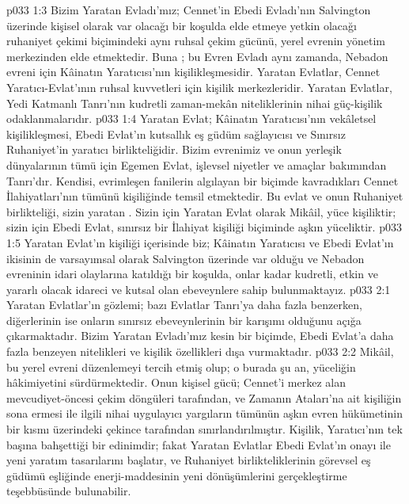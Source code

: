 \vs p033 1:3 Bizim Yaratan Evladı’mız; Cennet’in Ebedi Evladı’nın Salvington üzerinde kişisel olarak var olacağı bir koşulda elde etmeye yetkin olacağı ruhaniyet çekimi biçimindeki aynı ruhsal çekim gücünü, yerel evrenin yönetim merkezinden elde etmektedir. Buna ; bu Evren Evladı aynı zamanda, Nebadon evreni için Kâinatın Yaratıcısı’nın kişilikleşmesidir. Yaratan Evlatlar, Cennet Yaratıcı\hyp{}Evlat’ının ruhsal kuvvetleri için kişilik merkezleridir. Yaratan Evlatlar, Yedi Katmanlı Tanrı’nın kudretli zaman\hyp{}mekân niteliklerinin nihai güç\hyp{}kişilik odaklanmalarıdır.
\vs p033 1:4 Yaratan Evlat; Kâinatın Yaratıcısı’nın vekâletsel kişilikleşmesi, Ebedi Evlat’ın kutsallık eş güdüm sağlayıcısı ve Sınırsız Ruhaniyet’in yaratıcı birlikteliğidir. Bizim evrenimiz ve onun yerleşik dünyalarının tümü için Egemen Evlat, işlevsel niyetler ve amaçlar bakımından Tanrı’dır. Kendisi, evrimleşen fanilerin algılayan bir biçimde kavradıkları Cennet İlahiyatları’nın tümünü kişiliğinde temsil etmektedir. Bu evlat ve onun Ruhaniyet birlikteliği, sizin yaratan . Sizin için Yaratan Evlat olarak Mikâil, yüce kişiliktir; sizin için Ebedi Evlat, sınırsız bir İlahiyat kişiliği biçiminde aşkın yüceliktir.
\vs p033 1:5 Yaratan Evlat’ın kişiliği içerisinde biz; Kâinatın Yaratıcısı ve Ebedi Evlat’ın ikisinin de varsayımsal olarak Salvington üzerinde var olduğu ve Nebadon evreninin idari olaylarına katıldığı bir koşulda, onlar kadar kudretli, etkin ve yararlı olacak idareci ve kutsal olan ebeveynlere sahip bulunmaktayız.
\vs p033 2:1 Yaratan Evlatlar’ın gözlemi; bazı Evlatlar Tanrı’ya daha fazla benzerken, diğerlerinin ise onların sınırsız ebeveynlerinin bir karışımı olduğunu açığa çıkarmaktadır. Bizim Yaratan Evladı’mız kesin bir biçimde, Ebedi Evlat’a daha fazla benzeyen nitelikleri ve kişilik özellikleri dışa vurmaktadır.
\vs p033 2:2 Mikâil, bu yerel evreni düzenlemeyi tercih etmiş olup; o burada şu an, yüceliğin hâkimiyetini sürdürmektedir. Onun kişisel gücü; Cennet’i merkez alan mevcudiyet\hyp{}öncesi çekim döngüleri tarafından, ve Zamanın Ataları’na ait kişiliğin sona ermesi ile ilgili nihai uygulayıcı yargıların tümünün aşkın evren hükümetinin bir kısmı üzerindeki çekince tarafından sınırlandırılmıştır. Kişilik, Yaratıcı’nın tek başına bahşettiği bir edinimdir; fakat Yaratan Evlatlar Ebedi Evlat’ın onayı ile yeni yaratım tasarılarını başlatır, ve Ruhaniyet birlikteliklerinin görevsel eş güdümü eşliğinde enerji\hyp{}maddesinin yeni dönüşümlerini gerçekleştirme teşebbüsünde bulunabilir.
